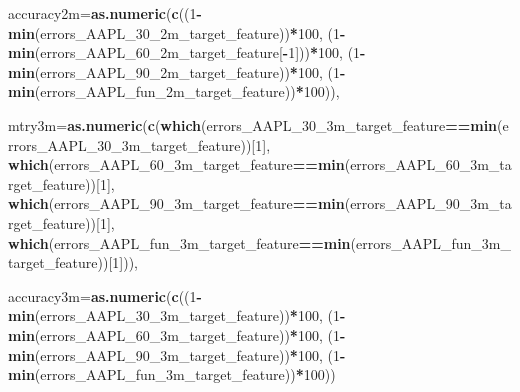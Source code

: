 \documentclass[]{article}
\newenvironment{Shaded}{\begin{snugshade}}{\end{snugshade}}
\newcommand{\KeywordTok}[1]{\textcolor[rgb]{0.13,0.29,0.53}{\textbf{#1}}}
\newcommand{\DataTypeTok}[1]{\textcolor[rgb]{0.13,0.29,0.53}{#1}}
\newcommand{\DecValTok}[1]{\textcolor[rgb]{0.00,0.00,0.81}{#1}}
\newcommand{\OperatorTok}[1]{\textcolor[rgb]{0.81,0.36,0.00}{\textbf{#1}}}
\newcommand{\NormalTok}[1]{#1}
\begin{document}
\begin{Shaded}
\begin{Highlighting}[]
                 \DataTypeTok{accuracy2m=}\KeywordTok{as.numeric}\NormalTok{(}\KeywordTok{c}\NormalTok{((}\DecValTok{1}\OperatorTok{-}\KeywordTok{min}\NormalTok{(errors_AAPL_30_2m_target_feature))}\OperatorTok{*}\DecValTok{100}\NormalTok{,}
\NormalTok{                                    (}\DecValTok{1}\OperatorTok{-}\KeywordTok{min}\NormalTok{(errors_AAPL_60_2m_target_feature[}\OperatorTok{-}\DecValTok{1}\NormalTok{]))}\OperatorTok{*}\DecValTok{100}\NormalTok{,}
\NormalTok{                                    (}\DecValTok{1}\OperatorTok{-}\KeywordTok{min}\NormalTok{(errors_AAPL_90_2m_target_feature))}\OperatorTok{*}\DecValTok{100}\NormalTok{,}
\NormalTok{                                    (}\DecValTok{1}\OperatorTok{-}\KeywordTok{min}\NormalTok{(errors_AAPL_fun_2m_target_feature))}\OperatorTok{*}\DecValTok{100}\NormalTok{)),}
              
              
              \DataTypeTok{mtry3m=}\KeywordTok{as.numeric}\NormalTok{(}\KeywordTok{c}\NormalTok{(}\KeywordTok{which}\NormalTok{(errors_AAPL_30_3m_target_feature}\OperatorTok{==}\KeywordTok{min}\NormalTok{(errors_AAPL_30_3m_target_feature))[}\DecValTok{1}\NormalTok{],}
                                    \KeywordTok{which}\NormalTok{(errors_AAPL_60_3m_target_feature}\OperatorTok{==}\KeywordTok{min}\NormalTok{(errors_AAPL_60_3m_target_feature))[}\DecValTok{1}\NormalTok{],}
                                   \KeywordTok{which}\NormalTok{(errors_AAPL_90_3m_target_feature}\OperatorTok{==}\KeywordTok{min}\NormalTok{(errors_AAPL_90_3m_target_feature))[}\DecValTok{1}\NormalTok{],}
                                   \KeywordTok{which}\NormalTok{(errors_AAPL_fun_3m_target_feature}\OperatorTok{==}\KeywordTok{min}\NormalTok{(errors_AAPL_fun_3m_target_feature))[}\DecValTok{1}\NormalTok{])),}
              
              \DataTypeTok{accuracy3m=}\KeywordTok{as.numeric}\NormalTok{(}\KeywordTok{c}\NormalTok{((}\DecValTok{1}\OperatorTok{-}\KeywordTok{min}\NormalTok{(errors_AAPL_30_3m_target_feature))}\OperatorTok{*}\DecValTok{100}\NormalTok{,}
\NormalTok{                                    (}\DecValTok{1}\OperatorTok{-}\KeywordTok{min}\NormalTok{(errors_AAPL_60_3m_target_feature))}\OperatorTok{*}\DecValTok{100}\NormalTok{,}
\NormalTok{                                    (}\DecValTok{1}\OperatorTok{-}\KeywordTok{min}\NormalTok{(errors_AAPL_90_3m_target_feature))}\OperatorTok{*}\DecValTok{100}\NormalTok{,}
\NormalTok{                                    (}\DecValTok{1}\OperatorTok{-}\KeywordTok{min}\NormalTok{(errors_AAPL_fun_3m_target_feature))}\OperatorTok{*}\DecValTok{100}\NormalTok{))}
              

\end{Highlighting}
\end{Shaded}
\end{document}
